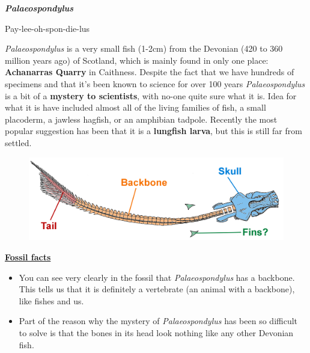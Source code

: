 \documentclass[12pt,letterpaper]{article}
\begin{document}

{\Huge\textbf{\textit{Palaeospondylus}}\par}
\vspace{3mm}
{\large{Pay-lee-oh-spon-die-lus} \par} 
\vspace{5mm}
\textit{Palaeospondylus} is a very small fish (1-2cm) from the Devonian (420 to 360 million years ago) of Scotland, which is mainly found in only one place: \textbf{Achanarras Quarry} in Caithness.  Despite the fact that we have hundreds of specimens and that it's been known to science for over 100 years \textit{Palaeospondylus} is a bit of a \textbf{mystery to scientists}, with no-one quite sure what it is.  Idea for what it is have included almost all of the living families of fish, a small placoderm, a jawless hagfish, or an amphibian tadpole.  Recently the most popular suggestion has been that it is a \textbf{lungfish larva}, but this is still far from settled.

\begin{figure}[h!]
\includegraphics[scale=0.45]{Palaeospondylus}
\centering
\end{figure}

{\large\textbf{\underline{Fossil facts}}\par}

\begin{itemize}
  \item You can see very clearly in the fossil that \textit{Palaeospondylus} has a backbone.  This tells us that it is definitely a vertebrate (an animal with a backbone), like fishes and us.
  \item Part of the reason why the mystery of \textit{Palaeospondylus} has been so difficult to solve is that the bones in its head look nothing like any other Devonian fish.
\end{itemize}
\end{document}
